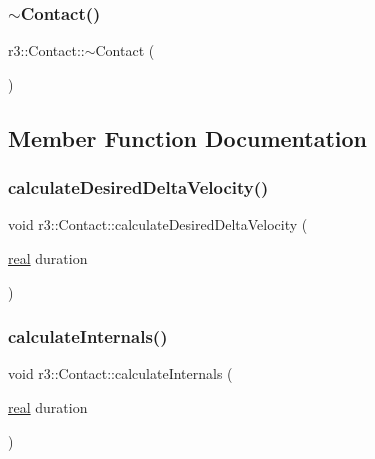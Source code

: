 \mbox{\label{classr3_1_1_contact_a011905bfa1cfa3ed459650796b105c6a}} 
\subsubsection{\texorpdfstring{$\sim$\+Contact()}{~Contact()}}
{\footnotesize\ttfamily r3\+::\+Contact\+::$\sim$\+Contact (\begin{DoxyParamCaption}{ }\end{DoxyParamCaption})\hspace{0.3cm}{\ttfamily [default]}}



\subsection{Member Function Documentation}
\mbox{\label{classr3_1_1_contact_a3f2c146006389bf6273cdd078763b7a3}} 
\subsubsection{\texorpdfstring{calculate\+Desired\+Delta\+Velocity()}{calculateDesiredDeltaVelocity()}}
{\footnotesize\ttfamily void r3\+::\+Contact\+::calculate\+Desired\+Delta\+Velocity (\begin{DoxyParamCaption}\item[{\mbox{\hyperlink{namespacer3_ab2016b3e3f743fb735afce242f0dc1eb}{real}}}]{duration }\end{DoxyParamCaption})}

\mbox{\label{classr3_1_1_contact_a4e00a32cb21ff4fc8ec826f163bcddae}} 
\subsubsection{\texorpdfstring{calculate\+Internals()}{calculateInternals()}}
{\footnotesize\ttfamily void r3\+::\+Contact\+::calculate\+Internals (\begin{DoxyParamCaption}\item[{\mbox{\hyperlink{namespacer3_ab2016b3e3f743fb735afce242f0dc1eb}{real}}}]{duration }\end{DoxyParamCaption})}

